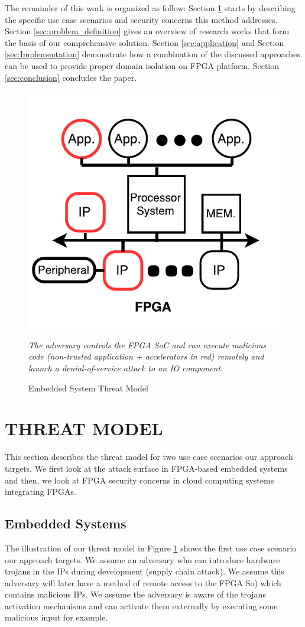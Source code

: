 \documentclass[sigconf]{acmart}
\theoremstyle{plain}
\theoremstyle{remark}
\begin{document}
The remainder of this work is organized as follow: Section \ref{sec:threat_model} starts by describing the specific use case scenarios and security concerns this method addresses. Section \ref{sec:problem_definition} gives an overview of research works that form the basis of our comprehensive solution. Section \ref{sec:application} and Section \ref{sec:Implementation} demonstrate how a combination of the discussed approaches can be used to provide proper domain isolation on FPGA platform. Section \ref{sec:conclusion} concludes the paper.

\begin{figure}[h]
\centering
\includegraphics[width=0.5\columnwidth]{figures/ThreatModel.pdf}
\caption{Embedded System Threat Model}
\textit{The adversary controls the FPGA SoC and can execute malicious code (non-trusted application + accelerators in red) remotely and launch a denial-of-service attack to an IO component.}
\label{fig:threat}
\end{figure}


\section{THREAT MODEL} \label{sec:threat_model}
This section describes the threat model for two use case scenarios our approach targets. We first look at the attack surface in FPGA-based embedded systems and then, we look at FPGA security concerns in cloud computing systems integrating FPGAs.

\subsection{Embedded Systems}
The illustration of our threat model in Figure \ref{fig:threat} shows the first use case scenario our approach targets. We assume an adversary who can introduce hardware trojans in the IPs during development (supply chain attack). We assume this adversary will later have a method of remote access to the FPGA So) which contains malicious IPs. We assume the adversary is aware of the trojans activation mechanisms and can activate them externally by executing some malicious input for example.
\end{document}
